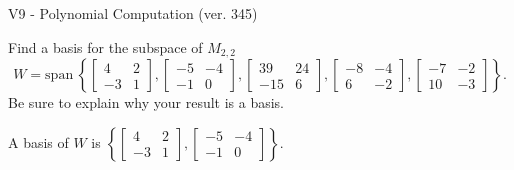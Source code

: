 \begin{exercise}
  \begin{exerciseTitle}V9 - Polynomial Computation (ver. 345)\end{exerciseTitle}
  \begin{exerciseStatement}
    Find a basis for the subspace of \(M_{2,2}\) 
\[W=\mathrm{span}\ \left\{\left[\begin{array}{cc}
4 & 2 \\
-3 & 1
\end{array}\right] , \left[\begin{array}{cc}
-5 & -4 \\
-1 & 0
\end{array}\right] , \left[\begin{array}{cc}
39 & 24 \\
-15 & 6
\end{array}\right] , \left[\begin{array}{cc}
-8 & -4 \\
6 & -2
\end{array}\right] , \left[\begin{array}{cc}
-7 & -2 \\
10 & -3
\end{array}\right]\right\}.\]
 Be sure to explain why your result is a basis.


  \end{exerciseStatement}
  \begin{exerciseAnswer}
   A basis of \(W\) is  \(\left\{\left[\begin{array}{cc}
4 & 2 \\
-3 & 1
\end{array}\right] , \left[\begin{array}{cc}
-5 & -4 \\
-1 & 0
\end{array}\right]\right\}\).
  


  \end{exerciseAnswer}
\end{exercise}